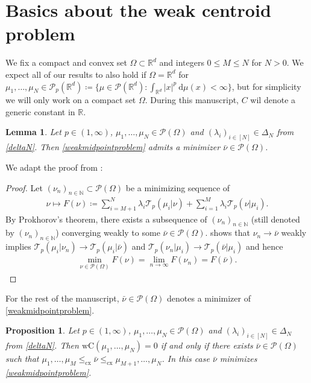 \documentclass[10pt,a4paper]{amsart}
\newcommand{\RR}{\mathbb{R}}
\newcommand{\NN}{\mathbb{N}}
\newcommand{\dd}{\mathrm{d}}
\newtheorem{lma}[thm]{Lemma}
\newtheorem{prop}[thm]{Proposition}
\begin{document}
\section{Basics about the weak centroid problem}
We fix a compact and convex set $\Omega\subset\RR^d$ and integers $0\leq M\leq N$ for $N>0$. We expect all of our results to also hold if $\Omega=\RR^d$ for $\mu_1,\dots,\mu_N\in\mathcal P_p(\RR^d)\coloneqq\big\{\mu\in\mathcal P(\RR^d):\int_{\RR^d}|x|^p\ \dd\mu(x)<\infty\}$, but for simplicity we will only work on a compact set $\Omega$. During this manuscript, $C$ wil denote a generic constant in $\RR$.
\begin{lma}
	Let $p\in (1,\infty)$,  $\mu_1,\dots,\mu_N\in\mathcal P(\Omega)$ and $(\lambda_i)_{i\in[N]}\in\Delta_N$ from \eqref{deltaN}. Then \eqref{weakmidpointproblem} admits a minimizer $\bar\nu\in\mathcal P(\Omega)$.
\end{lma}
We adapt the proof from \cite[Prop 1]{cazelles2021}:
\begin{proof}
	Let $(\nu_n)_{n\in\NN}\subset\mathcal P(\Omega)$ be a minimizing sequence of 
	\begin{gather*}
		\nu\mapsto F(\nu)\coloneqq \sum_{i=M+1}^N\mathcal \lambda_i \mathcal T_p(\mu_i|\nu)+\sum_{i=1}^M\lambda_i\mathcal T_p(\nu|\mu_i).
	\end{gather*}
	By Prokhorov's theorem, there exists a subsequence of $(\nu_n)_{n\in\NN}$ (still denoted by $(\nu_n)_{n\in\NN}$) converging weakly to some $\bar\nu\in\mathcal P(\Omega)$. \cite[Thm 1.5]{backhoff2020} shows that $\nu_n\rightarrow\bar\nu$ weakly implies $\mathcal T_p(\mu_i|\nu_n)\rightarrow\mathcal T_p(\mu_i|\bar\nu)$ and $\mathcal T_p(\nu_n|\mu_i)\rightarrow\mathcal T_p(\bar\nu|\mu_i)$ and hence
	\begin{gather*}
		\min_{\nu\in\mathcal P(\Omega)}F(\nu)=\lim_{n\rightarrow\infty}F(\nu_n)=F(\bar\nu).
	\end{gather*}
\end{proof}
For the rest of the manuscript, $\bar\nu\in\mathcal P(\Omega)$ denotes a minimizer of \eqref{weakmidpointproblem}.
\begin{prop}\label{zeroclassprop}
	Let $p\in(1,\infty)$, $\mu_1,\dots,\mu_N\in\mathcal P(\Omega)$ and 
	$(\lambda_i)_{i\in[N]}\in\Delta_N$ from \eqref{deltaN}. Then $\text{wC}(\mu_1,\dots,\mu_N)=0$ if and only if there exists $\bar\nu\in\mathcal P(\Omega)$ such that $\mu_1,\dots,\mu_M\leq_{\text{cx}}\bar\nu\leq_{\text{cx}}\mu_{M+1},\dots,\mu_{N}$. In this case $\bar\nu$ minimizes \eqref{weakmidpointproblem}.
\end{prop}
\end{document}
